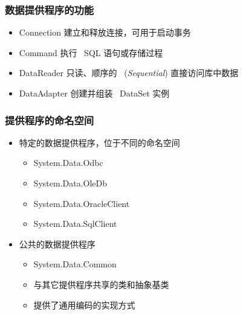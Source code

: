 \begin{frame}
\frametitle{数据提供程序的功能}
\begin{itemize}
\item Connection 建立和释放连接，可用于启动事务
\item Command 执行 ~SQL 语句或存储过程
\item DataReader 只读、顺序的 ~(\textit{Sequential}) 直接访问库中数据
\item DataAdapter 创建并组装 ~DataSet 实例
\end{itemize}
\begin{center}
  
\end{center}
\end{frame}

\begin{frame}
\frametitle{提供程序的命名空间}
\begin{itemize}
\setlength{\itemsep}{8pt plus 1pt}
\item 特定的数据提供程序，位于不同的命名空间
\begin{itemize}
\setlength{\itemsep}{6pt plus 1pt}
\item System.Data.Odbc
\item System.Data.OleDb
\item System.Data.OracleClient
\item System.Data.SqlClient
\end{itemize}
\item 公共的数据提供程序
  \begin{itemize}
  \item System.Data.Common
  \smallskip
  \item 与其它提供程序共享的类和抽象基类
  \item 提供了通用编码的实现方式
  \end{itemize}
\end{itemize}
\end{frame}

